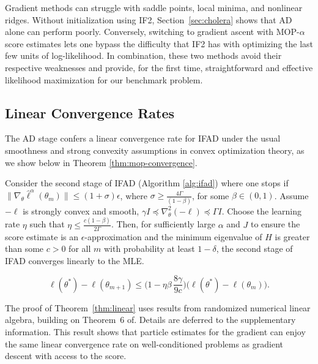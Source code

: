 \documentclass[9pt,twocolumn,pnasresearcharticle]{pnas-new}
\newcommand\arxiv[2]{#2} %
\begin{document}
Gradient methods can struggle with saddle points, local minima, and nonlinear ridges.
Without initialization using IF2, Section~\ref{sec:cholera} shows that AD alone can perform poorly.
Conversely, switching to gradient ascent with MOP-$\alpha$ score estimates lets one bypass the difficulty that IF2 has with optimizing the last few units of log-likelihood. 
In combination, these two methods avoid their respective weaknesses and provide, for the first time, straightforward and effective likelihood maximization for our benchmark problem.

\arxiv{}{\vspace*{-2mm}}
\subsection{Linear Convergence Rates}

The AD stage confers a linear convergence rate for IFAD under the usual smoothness and strong convexity assumptions in convex optimization theory, as we show below in Theorem \ref{thm:mop-convergence}.

\begin{thm} \label{thm:linear}
    
Consider the second stage of IFAD (Algorithm \ref{alg:ifad}) where one stops if $\|\nabla_\theta \hat\ell^\alpha(\theta_m)\| \leq (1+\sigma) \epsilon$, where $\sigma \geq \frac{4 \Gamma}{(1-\beta)}$, for some $\beta \in (0,1)$. Assume $-\ell$ is strongly convex and smooth, $\gamma I \preceq \nabla_\theta^2 (-\ell) \preceq \Gamma I$. Choose the learning rate $\eta$ such that $\eta \leq \frac{c(1-\beta)}{2\Gamma}$. Then, for sufficiently large $\alpha$ and $J$ to ensure the score estimate is an $\epsilon$-approximation and the minimum eigenvalue of $H$ is greater than some $c > 0$ for all $m$ with probability at least $1-\delta$, the second stage of IFAD converges linearly to the MLE.

\arxiv{}{\vspace*{-2mm}}
$$
\ell(\theta^*) - \ell(\theta_{m+1}) \leq \Big(1-\eta\beta\, \frac{8\gamma}{9c}\Big)\big(\ell(\theta^*)-\ell(\theta_m)\big).
$$
\label{thm:mop-convergence}
\end{thm}
\arxiv{}{\vspace*{-5mm}}
The proof of Theorem~\ref{thm:linear} uses results from randomized numerical linear algebra, building on Theorem~6 of\cite{mahoney16}. 
Details are deferred to \arxiv{Appendix~\ref{appendix:convergence}}{the supplementary information}. 
This result shows that particle estimates for the gradient can enjoy the same linear convergence rate on well-conditioned problems as gradient descent with access to the score. 
\end{document}
